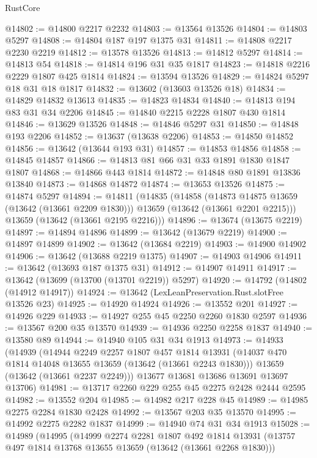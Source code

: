 \begin{lexlean}{RustCore}
\begin{coremodule}
@14802 := @14800 @2217 @2232
@14803 := @13564 @13526
@14804 := @14803 @5297
@14808 := @14804 @187 @197 @1375 @31
@14811 := @14808 @2217 @2230 @2219
@14812 := @13578 @13526
@14813 := @14812 @5297
@14814 := @14813 @54
@14818 := @14814 @196 @31 @35 @1817
@14823 := @14818 @2216 @2229 @1807 @425 @1814
@14824 := @13594 @13526
@14829 := @14824 @5297 @18 @31 @18 @1817
@14832 := @13602 (@13603 @13526 @18)
@14834 := @14829 @14832 @13613
@14835 := @14823 @14834
@14840 := @14813 @194 @83 @31 @34 @2206
@14845 := @14840 @2215 @2228 @1807 @430 @1814
@14846 := @13629 @13526
@14848 := @14846 @5297 @31
@14850 := @14848 @193 @2206
@14852 := @13637 (@13638 @2206)
@14853 := @14850 @14852
@14856 := @13642 (@13644 @193 @31)
@14857 := @14853 @14856
@14858 := @14845 @14857
@14866 := @14813 @81 @66 @31 @33 @1891 @1830 @1847 @1807
@14868 := @14866 @443 @1814
@14872 := @14848 @80 @1891 @13836 @13840
@14873 := @14868 @14872
@14874 := @13653 @13526
@14875 := @14874 @5297
@14894 := @14811
    (@14835
      (@14858
        (@14873 @14875 @13659 (@13642 (@13661 @2209 @1830)))
        @13659
        (@13642 (@13661 @2201 @2215)))
      @13659
      (@13642 (@13661 @2195 @2216)))
@14896 := @13674 (@13675 @2219)
@14897 := @14894 @14896
@14899 := @13642 (@13679 @2219)
@14900 := @14897 @14899
@14902 := @13642 (@13684 @2219)
@14903 := @14900 @14902
@14906 := @13642 (@13688 @2219 @1375)
@14907 := @14903 @14906
@14911 := @13642 (@13693 @187 @1375 @31)
@14912 := @14907 @14911
@14917 := @13642 (@13699 (@13700 (@13701 @2219)) @5297)
@14920 := @14792 (@14802 (@14912 @14917))
@14924 := @13642 (LexLeanPreservation.Rust.slotFree @13526 @23)
@14925 := @14920 @14924
@14926 := @13552 @201
@14927 := @14926 @229
@14933 := @14927 @255 @45 @2250 @2260 @1830 @2597
@14936 := @13567 @200 @35 @13570
@14939 := @14936 @2250 @2258 @1837
@14940 := @13580 @89
@14944 := @14940 @105 @31 @34 @1913
@14973 := @14933
    (@14939
      (@14944
        @2249
        @2257
        @1807
        @457
        @1814
        @13931
        (@14037 @470 @1814 @14048 @13655 @13659 (@13642 (@13661 @2243 @1830)))
        @13659
        (@13642 (@13661 @2237 @2249)))
      @13677
      @13681
      @13686
      @13691
      @13697
      @13706)
@14981 := @13717 @2260 @229 @255 @45 @2275 @2428 @2444 @2595
@14982 := @13552 @204
@14985 := @14982 @217 @228 @45
@14989 := @14985 @2275 @2284 @1830 @2428
@14992 := @13567 @203 @35 @13570
@14995 := @14992 @2275 @2282 @1837
@14999 := @14940 @74 @31 @34 @1913
@15028 := @14989
    (@14995
      (@14999
        @2274
        @2281
        @1807
        @492
        @1814
        @13931
        (@13757 @497 @1814 @13768 @13655 @13659 (@13642 (@13661 @2268 @1830)))

\end{coremodule}
\end{lexlean}
